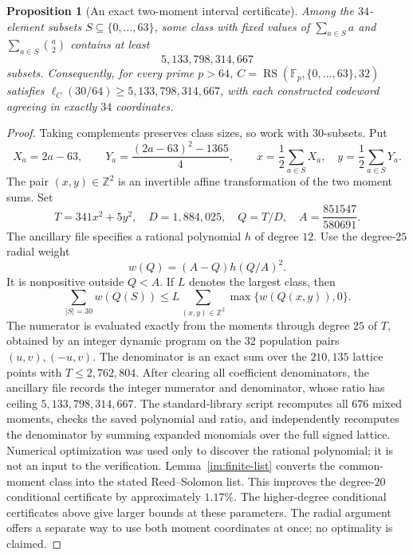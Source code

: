 \documentclass[11pt,letterpaper]{article}
\newtheorem{proposition}[theorem]{Proposition}
\theoremstyle{definition}
\theoremstyle{remark}
\newcommand{\F}{\mathbb F}
\newcommand{\RS}{\operatorname{RS}}
\begin{document}
\begin{proposition}[An exact two-moment interval certificate]
\label{prop:radial-certificate}
Among the $34$-element subsets $S\subseteq\{0,\ldots,63\}$, some class with
fixed values of $\sum_{a\in S}a$ and $\sum_{a\in S}\binom a2$ contains at least
\[
  5{,}133{,}798{,}314{,}667
\]
subsets. Consequently, for every prime $p>64$,
$C=\RS(\F_p,\{0,\ldots,63\},32)$ satisfies
$\ell_C(30/64)\ge5{,}133{,}798{,}314{,}667$, with each constructed
codeword agreeing in exactly $34$ coordinates.
\end{proposition}
\begin{proof}
Taking complements preserves class sizes, so work with $30$-subsets.
Put
\[
 X_a=2a-63,\qquad Y_a=\frac{(2a-63)^2-1365}{4},\qquad
 x=\frac12\sum_{a\in S}X_a,\quad y=\frac12\sum_{a\in S}Y_a.
\]
The pair $(x,y)\in\mathbb Z^2$ is an invertible affine transformation of the
two moment sums.  Set
\[
 T=341x^2+5y^2,\quad D=1{,}884{,}025,\quad
 Q=T/D,\quad A=\frac{851547}{580691}.
\]
The ancillary file  specifies a rational
polynomial $h$ of degree $12$.  Use the degree-$25$ radial weight
\[
 w(Q)=(A-Q)h(Q/A)^2.
\]
It is nonpositive outside $Q<A$.  If $L$ denotes the largest class, then
\[
 \sum_{|S|=30}w(Q(S))
 \le L\sum_{(x,y)\in\mathbb Z^2}\max\{w(Q(x,y)),0\}.
\]
The numerator is evaluated exactly from the moments through degree $25$
of $T$, obtained by an integer dynamic program on the $32$ population pairs
$(u,v),(-u,v)$.  The denominator is an exact sum over the $210{,}135$ lattice
points with $T\le2{,}762{,}804$.  After clearing all coefficient denominators,
the ancillary file records the integer numerator and denominator, whose
ratio has ceiling $5{,}133{,}798{,}314{,}667$.
The standard-library script  recomputes all
$676$ mixed moments, checks the saved polynomial and ratio, and independently
recomputes the denominator by summing expanded monomials over the full signed
lattice.  Numerical optimization was used only to discover the rational
polynomial; it is not an input to the verification.
Lemma~\ref{im:finite-list} converts the common-moment class into the
stated Reed--Solomon list. This improves the degree-$20$ conditional
certificate by approximately $1.17\%$. The higher-degree conditional
certificates above give larger bounds at these parameters. The radial
argument offers a separate way to use both moment coordinates at once;
no optimality is claimed.
\end{proof}
\end{document}
